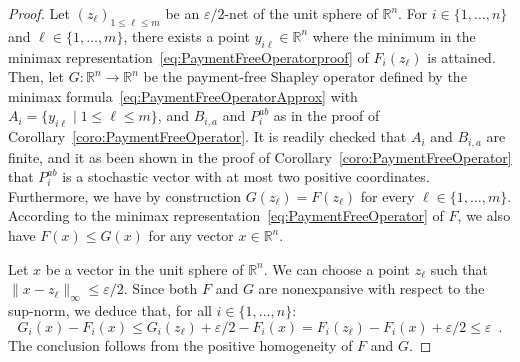 \documentclass[a4paper,11pt]{amsart}
\theoremstyle{definition}
\theoremstyle{remark}
\begin{document}
\begin{proof}
  Let $(z_\ell)_{1 {\leqslant} \ell {\leqslant} m}$ be an $\varepsilon / 2$-net of the unit sphere of ${\mathbb{R}}^n$.
  For $i \in \{1,\dots,n\}$ and $\ell \in \{1,\dots,m\}$, there exists a point $y_{i \ell} \in {\mathbb{R}}^n$ where the minimum in the minimax representation~\eqref{eq:PaymentFreeOperatorproof} of $F_i(z_\ell)$ is attained.
  Then, let $G: {\mathbb{R}}^n \to {\mathbb{R}}^n$ be the payment-free Shapley operator defined by the minimax formula~\eqref{eq:PaymentFreeOperatorApprox} with $A_i = \{y_{i \ell} \mid 1 {\leqslant} \ell {\leqslant} m\}$, and $B_{i,a}$ and $P_i^{a b}$ as in the proof of Corollary~\ref{coro:PaymentFreeOperator}.
  It is readily checked that $A_i$ and $B_{i,a}$ are finite, and it as been shown in the proof of Corollary~\ref{coro:PaymentFreeOperator} that $P_i^{a b}$ is a stochastic vector with at most two positive coordinates.
  Furthermore, we have by construction $G(z_\ell) = F(z_\ell)$ for every $\ell \in \{1,\dots,m\}$.
  According to the minimax representation~\eqref{eq:PaymentFreeOperator} of $F$, we also have $F(x) {\leqslant} G(x)$ for any vector $x \in {\mathbb{R}}^n$.

  Let $x$ be a vector in the unit sphere of ${\mathbb{R}}^n$.
  We can choose a point $z_\ell$ such that $\|x-z_\ell\|_\infty {\leqslant} \varepsilon / 2$. 
  Since both $F$ and $G$ are nonexpansive with respect to the sup-norm, we deduce that, for all $i \in \{1,\dots,n\}$:
  \[
    G_i(x) - F_i(x) {\leqslant} G_i(z_\ell) + \varepsilon / 2 - F_i(x) = F_i(z_\ell) - F_i(x) + \varepsilon / 2 {\leqslant} \varepsilon \enspace .
  \]
  The conclusion follows from the positive homogeneity of $F$ and $G$.
\end{proof}




\end{document}
